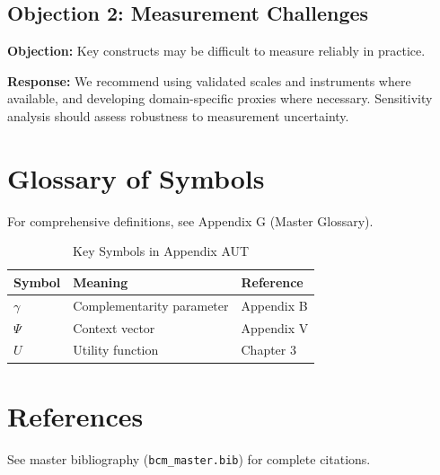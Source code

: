 \subsection{Objection 2: Measurement Challenges}

\textbf{Objection:} Key constructs may be difficult to measure reliably in
practice.

\textbf{Response:} We recommend using validated scales and instruments where
available, and developing domain-specific proxies where necessary. Sensitivity
analysis should assess robustness to measurement uncertainty.



\section{Glossary of Symbols}
\label{sec:aut-glossary}

For comprehensive definitions, see Appendix G (Master Glossary).

\begin{table}[htbp]
\centering
\caption{Key Symbols in Appendix AUT}
\begin{tabular}{lll}
\toprule
\textbf{Symbol} & \textbf{Meaning} & \textbf{Reference} \\
\midrule
$\gamma$ & Complementarity parameter & Appendix B \\
$\Psi$ & Context vector & Appendix V \\
$U$ & Utility function & Chapter 3 \\
\bottomrule
\end{tabular}
\end{table}


\section{References}
\label{sec:aut-references}

See master bibliography (\texttt{bcm\_master.bib}) for complete citations.

\nocite{bcm_master}


